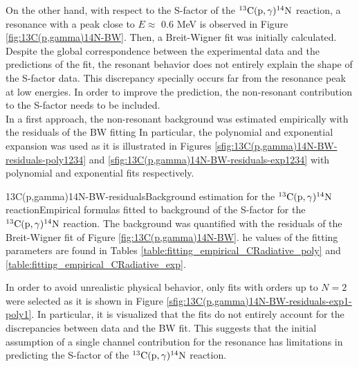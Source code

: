 \documentclass[openany]{book}
\begin{document}
 



On the other hand, with respect to the S-factor of the $\mathrm{{}^{13}C(p, \gamma){}^{14}N}$ reaction, a resonance with a peak close to $E\approx$  0.6 MeV is observed in Figure \ref{fig:13C(p,gamma)14N-BW}. Then, a Breit-Wigner fit was initially calculated.  \\


Despite the global correspondence between the experimental data and the predictions of the fit, the resonant behavior does not entirely explain the shape of the S-factor data. This discrepancy specially  occurs far from the resonance peak at low energies. In order to improve the prediction, the non-resonant contribution to the S-factor needs to be included. \\

In a first approach, the non-resonant background was estimated empirically with the residuals of the BW fitting In particular, the polynomial and exponential expansion was used as it is illustrated in Figures \ref{sfig:13C(p,gamma)14N-BW-residuals-poly1234} and \ref{sfig:13C(p,gamma)14N-BW-residuals-exp1234} with polynomial and exponential fits respectively.

{13C(p,gamma)14N-BW-residuals}{Background estimation for the $\mathrm{{}^{13}C(p, \gamma){}^{14}N}$ reaction}{Empirical formulas fitted to background of the S-factor for the $\mathrm{{}^{13}C(p, \gamma){}^{14}N}$ reaction. The background was quantified with the residuals of the Breit-Wigner fit of Figure \ref{fig:13C(p,gamma)14N-BW}. he values of the fitting parameters are found in Tables \ref{table:fitting_empirical_CRadiative_poly} and \ref{table:fitting_empirical_CRadiative_exp}.}

In order to avoid unrealistic physical behavior, only fits with orders up to $N = 2$ were selected as it is shown in Figure \ref{sfig:13C(p,gamma)14N-BW-residuals-exp1-poly1}. In particular, it is visualized that the fits do not entirely account for the discrepancies between data and the BW fit. This suggests that the initial assumption of a single channel contribution for the resonance has limitations in predicting the S-factor of the $\mathrm{{}^{13}C(p, \gamma){}^{14}N}$ reaction. \\
\end{document}
